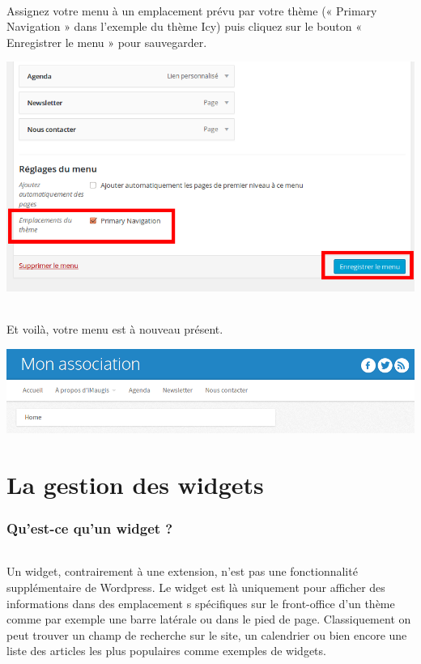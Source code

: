 \documentclass[10pt,a4paper]{article}
\begin{document}
\paragraph{}Assignez votre menu à un emplacement prévu par votre thème (« Primary Navigation » dans l'exemple du thème Icy) puis cliquez sur le bouton « Enregistrer le menu » pour sauvegarder.
\begin{center}
\includegraphics[scale=0.3]{img/0250.png}
\end{center}
\paragraph{}Et voilà, votre menu est à nouveau présent.
\begin{center}
\includegraphics[scale=0.3]{img/0251.png}
\end{center}
\newpage

\part{La gestion des widgets}
\newpage
\section{Qu'est-ce qu'un widget ?}
\paragraph{}Un widget, contrairement à une extension, n'est pas une fonctionnalité supplémentaire de Wordpress. Le widget est là uniquement pour afficher des informations dans des emplacement s spécifiques sur le front-office d'un thème comme par exemple une barre latérale ou dans le pied de page. Classiquement on peut trouver un champ de recherche sur le site, un calendrier ou bien encore une liste des articles les plus populaires comme exemples de widgets.
\end{document}

